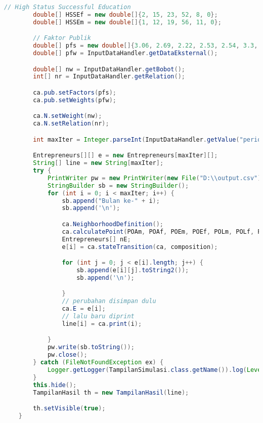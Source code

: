 \begin{lstlisting}[language=Java, caption=Entrepreneurs.java]
        // High Status Successful Education
        double[] HSSEf = new double[]{2, 15, 23, 52, 8, 0};
        double[] HSSEm = new double[]{1, 12, 19, 56, 11, 0};

        // Faktor Publik
        double[] pfs = new double[]{3.06, 2.69, 2.22, 2.53, 2.54, 3.3, 2.31, 3.25, 3.92, 2.82, 3.45, 3.29};
        double[] pfw = InputDataHandler.getDataEksternal();

        double[] nw = InputDataHandler.getBobot();
        int[] nr = InputDataHandler.getRelation();

        ca.pub.setFactors(pfs);
        ca.pub.setWeights(pfw);

        ca.N.setWeight(nw);
        ca.N.setRelation(nr);

        int maxIter = Integer.parseInt(InputDataHandler.getValue("periode")); // masukan periode

        Entrepreneurs[][] e = new Entrepreneurs[maxIter][];
        String[] line = new String[maxIter];
        try {
            PrintWriter pw = new PrintWriter(new File("D:\\output.csv"));
            StringBuilder sb = new StringBuilder();
            for (int i = 0; i < maxIter; i++) {
                sb.append("Bulan ke-" + i);
                sb.append('\n');

                ca.NeighborhoodDefinition();
                ca.calculatePoint(POAm, POAf, POEm, POEf, POLm, POLf, POIm, POIf, PCAm, PCAf, PCEm, PCEf, PCLm, PCLf, PCIm, PCIf, RMAm, RMAf, RMIm, RMIf, FFAf, FFAm, FFEf, FFEm, FFLf, FFLm, MALf, MALm, MAIf, MAIm, HSSIf, HSSIm, HSSLf, HSSLm, HSSAf, HSSAm, HSSEf, HSSEm);
                Entrepreneurs[] nE;
                e[i] = ca.stateTransition(ca, composition);

                for (int j = 0; j < e[i].length; j++) {
                    sb.append(e[i][j].toString2());
                    sb.append('\n');

                }
                // perubahan disimpan dulu
                ca.E = e[i];
                // lalu baru diprint
                line[i] = ca.print(i);

            }
            pw.write(sb.toString());
            pw.close();
        } catch (FileNotFoundException ex) {
            Logger.getLogger(TampilanSimulasi.class.getName()).log(Level.SEVERE, null, ex);
        }
        this.hide();
        TampilanHasil th = new TampilanHasil(line);

        th.setVisible(true);
    }                                           


\end{lstlisting}
